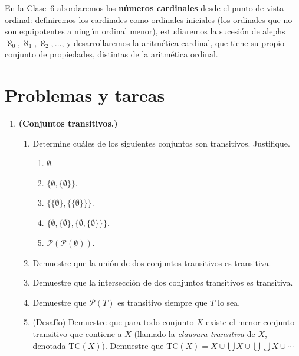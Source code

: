 En la Clase~6 abordaremos los \textbf{números cardinales} desde el punto de vista ordinal: definiremos los cardinales como ordinales iniciales (los ordinales que no son equipotentes a ningún ordinal menor), estudiaremos la sucesión de alephs $\aleph_0, \aleph_1, \aleph_2, \ldots$, y desarrollaremos la aritmética cardinal, que tiene su propio conjunto de propiedades, distintas de la aritmética ordinal.

\section{Problemas y tareas}

\begin{enumerate}[leftmargin=2.5em, label=\textbf{\arabic*.}]

  \item \textbf{(Conjuntos transitivos.)}
  \begin{enumerate}[label=(\alph*)]
    \item Determine cuáles de los siguientes conjuntos son transitivos. Justifique.
    \begin{enumerate}[label=(\roman*)]
      \item $\emptyset$.
      \item $\{\emptyset, \{\emptyset\}\}$.
      \item $\{\{\emptyset\}, \{\{\emptyset\}\}\}$.
      \item $\{\emptyset, \{\emptyset\}, \{\emptyset, \{\emptyset\}\}\}$.
      \item $\mathcal{P}(\mathcal{P}(\emptyset))$.
    \end{enumerate}
    \item Demuestre que la unión de dos conjuntos transitivos es transitiva.
    \item Demuestre que la intersección de dos conjuntos transitivos es transitiva.
    \item Demuestre que $\mathcal{P}(T)$ es transitivo siempre que $T$ lo sea.
    \item (Desafío) Demuestre que para todo conjunto $X$ existe el menor conjunto transitivo que contiene a $X$ (llamado la \emph{clausura transitiva} de $X$, denotada $\mathrm{TC}(X)$). Demuestre que $\mathrm{TC}(X) = X \cup \bigcup X \cup \bigcup\bigcup X \cup \cdots$
  \end{enumerate}


\end{enumerate}
